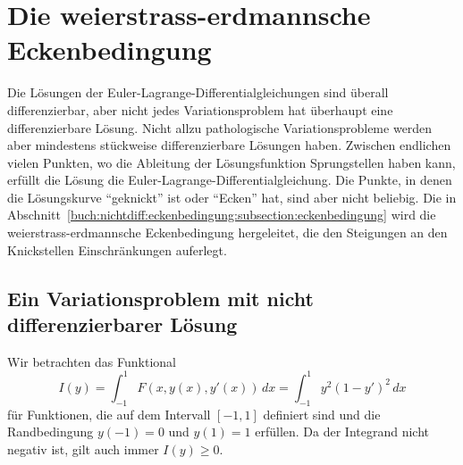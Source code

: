 %
%
%
\section{Die weierstrass-erdmannsche Eckenbedingung
\label{buch:nichtdiff:section:ecken}}
Die Lösungen der Euler-Lagrange-Differentialgleichungen sind überall
differenzierbar, aber nicht jedes Variationsproblem hat überhaupt
eine differenzierbare Lösung.
Nicht allzu pathologische Variationsprobleme werden aber mindestens
stückweise differenzierbare Lösungen haben.
Zwischen endlichen vielen Punkten, wo die Ableitung der Lösungsfunktion
Sprungstellen haben kann, erfüllt die Lösung die
Euler-Lagrange-Differential\-glei\-chung.
Die Punkte, in denen die Lösungskurve ``geknickt'' ist oder ``Ecken''
hat, sind aber nicht beliebig.
Die in Abschnitt~\ref{buch:nichtdiff:eckenbedingung:subsection:eckenbedingung}
wird die weierstrass-erdmannsche Eckenbedingung hergeleitet, die
den Steigungen an den Knickstellen Einschränkungen auferlegt.

%
%
\subsection{Ein Variationsproblem mit nicht differenzierbarer Lösung
\label{buch:nichtdiff:eckenbedingung:subsection:problem}}
Wir betrachten das Funktional
\begin{equation}
I(y)
=
\int_{-1}^1 F(x,y(x),y'(x))\,dx
=
\int_{-1}^1 y^2(1-y')^2\,dx
\label{buch:nichtdiff:eckenbedingung:eqn:l}
\end{equation}
für Funktionen, die auf dem Intervall $[-1,1]$ definiert sind und
die Randbedingung $y(-1) = 0$ und $y(1)=1$ erfüllen.
Da der Integrand nicht negativ ist, gilt auch immer $I(y)\ge 0$.

